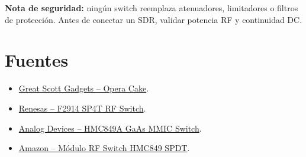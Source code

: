 \documentclass[11pt]{article}
\begin{document}
\begin{advertencia}
\textbf{Nota de seguridad:} ningún switch reemplaza atenuadores, limitadores o filtros de protección. Antes de conectar un SDR, validar potencia RF y continuidad DC.
\end{advertencia}

\section{Fuentes}

\begin{itemize}
    \item \href{https://greatscottgadgets.com/hackrf/operacake/}{Great Scott Gadgets -- Opera Cake}.
    \item \href{https://www.renesas.com/en/products/rf-products/rf-switches/f2914-high-reliability-sp4t-rf-switch}{Renesas -- F2914 SP4T RF Switch}.
    \item \href{https://www.analog.com/en/products/hmc849.html}{Analog Devices -- HMC849A GaAs MMIC Switch}.
    \item \href{https://www.amazon.com/Switch-Module-Single-Impedance-Reliability/dp/B0BXVVLGFB}{Amazon -- Módulo RF Switch HMC849 SPDT}.
\end{itemize}
\end{document}
